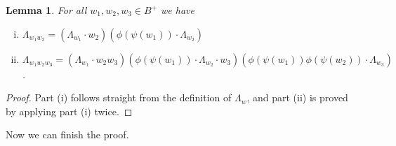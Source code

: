 \documentclass[11pt]{amsart}
\newtheorem{lem}{Lemma}
\theoremstyle{plain}
\begin{document}
\begin{lem}\label{split}
For all $w_1, w_2, w_3 \in B^+$ we have
\begin{enumerate}[(i)]
\item $\Lambda_{w_1 w_2} = (\Lambda_{w_1} \cdot w_2) (\phi (\psi (w_1)) \cdot \Lambda_{w_2} )$
\item $\Lambda_{w_1 w_2 w_3} = (\Lambda_{w_1} \cdot w_2 w_3) (\phi (\psi (w_1)) \cdot  \Lambda_{w_2} \cdot w_3) (\phi (\psi (w_1)) \phi (\psi (w_2)) \cdot \Lambda_{w_3}     )$.
\end{enumerate}
\end{lem}
\begin{proof}
Part (i) follows straight from the definition of $\Lambda_w$, and part (ii) is proved by applying part (i) twice.
\end{proof}

Now we can finish the proof.
\end{document}
